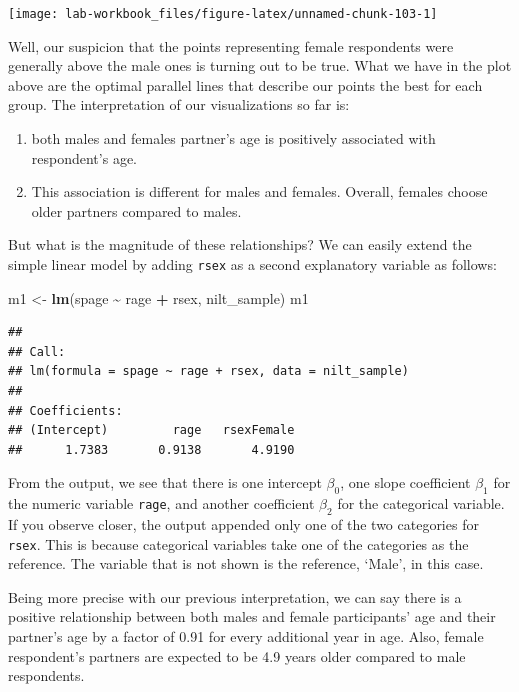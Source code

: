 \documentclass[
]{book}
\newenvironment{Shaded}{\begin{snugshade}}{\end{snugshade}}
\newcommand{\FunctionTok}[1]{\textcolor[rgb]{0.13,0.29,0.53}{\textbf{#1}}}
\newcommand{\NormalTok}[1]{#1}
\newcommand{\OtherTok}[1]{\textcolor[rgb]{0.56,0.35,0.01}{#1}}
\newcommand{\SpecialCharTok}[1]{\textcolor[rgb]{0.81,0.36,0.00}{\textbf{#1}}}
\providecommand{\tightlist}{%
  \setlength{\itemsep}{0pt}\setlength{\parskip}{0pt}}
\begin{document}
\begin{flushleft}\texttt{[image: lab-workbook\_files/figure-latex/unnamed-chunk-103-1]} \end{flushleft}

Well, our suspicion that the points representing female respondents were generally above the male ones is turning out to be true. What we have in the plot above are the optimal parallel lines that describe our points the best for each group. The interpretation of our visualizations so far is:

\begin{enumerate}
\def\labelenumi{\arabic{enumi}.}
\tightlist
\item
  both males and females partner's age is positively associated with respondent's age.
\item
  This association is different for males and females. Overall, females choose older partners compared to males.
\end{enumerate}

But what is the magnitude of these relationships? We can easily extend the simple linear model by adding \texttt{rsex} as a second explanatory variable as follows:

\begin{Shaded}
\begin{Highlighting}[]
\NormalTok{m1 }\OtherTok{\textless{}{-}} \FunctionTok{lm}\NormalTok{(spage }\SpecialCharTok{\textasciitilde{}}\NormalTok{ rage }\SpecialCharTok{+}\NormalTok{ rsex, nilt\_sample)}
\NormalTok{m1}
\end{Highlighting}
\end{Shaded}

\begin{verbatim}
## 
## Call:
## lm(formula = spage ~ rage + rsex, data = nilt_sample)
## 
## Coefficients:
## (Intercept)         rage   rsexFemale  
##      1.7383       0.9138       4.9190
\end{verbatim}

From the output, we see that there is one intercept \(\beta_0\), one slope coefficient \(\beta_1\) for the numeric variable \texttt{rage}, and another coefficient \(\beta_2\) for the categorical variable. If you observe closer, the output appended only one of the two categories for \texttt{rsex}. This is because categorical variables take one of the categories as the reference. The variable that is not shown is the reference, `Male', in this case.

Being more precise with our previous interpretation, we can say there is a positive relationship between both males and female participants' age and their partner's age by a factor of 0.91 for every additional year in age. Also, female respondent's partners are expected to be 4.9 years older compared to male respondents.
\end{document}
